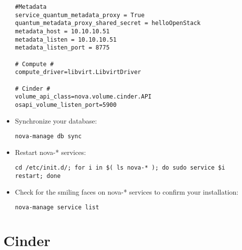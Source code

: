 \begin{itemize}
\begin{verbatim}
#Metadata
service_quantum_metadata_proxy = True
quantum_metadata_proxy_shared_secret = helloOpenStack
metadata_host = 10.10.10.51
metadata_listen = 10.10.10.51
metadata_listen_port = 8775

# Compute #
compute_driver=libvirt.LibvirtDriver

# Cinder #
volume_api_class=nova.volume.cinder.API
osapi_volume_listen_port=5900
\end{verbatim}


\item Synchronize your database:

\begin{verbatim}
nova-manage db sync
\end{verbatim}


\item Restart nova-* services:

\begin{verbatim}
cd /etc/init.d/; for i in $( ls nova-* ); do sudo service $i restart; done   
\end{verbatim}


\item Check for the smiling faces on nova-* services to confirm your installation:

\begin{verbatim}
nova-manage service list
\end{verbatim}


\end{itemize}

\section{Cinder}
\label{cinder}

